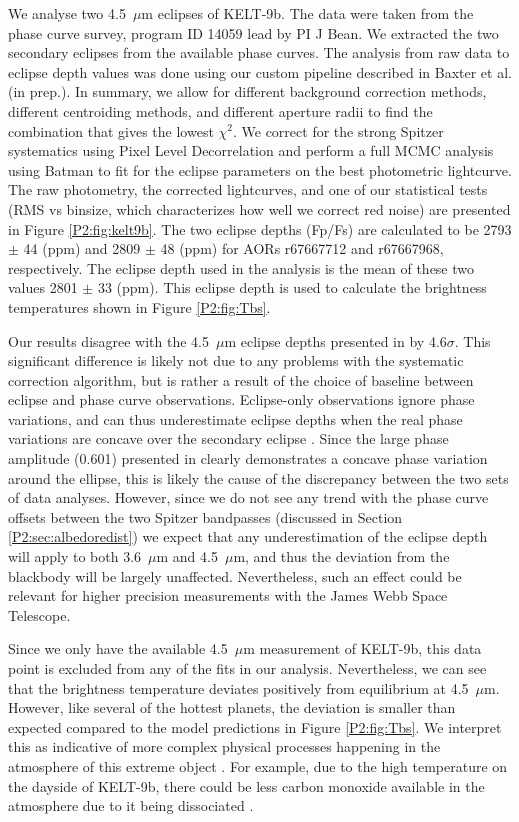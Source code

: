 \begin{subappendices}
We analyse two 4.5~$\mu$m eclipses of KELT-9b. The data were taken from the phase curve survey,   program ID 14059 lead by PI J Bean. We extracted the two secondary eclipses from the available phase curves. The analysis from raw data to eclipse depth values was done using our custom pipeline described in Baxter et al. (in prep.). In summary, we allow for different background correction methods, different centroiding methods, and different aperture radii to find the combination that gives the lowest $\chi^2$. We correct for the strong Spitzer systematics using Pixel Level Decorrelation \citep{Deming2015} and perform a full MCMC analysis using Batman \citep{Kreidberg2015} to fit for the eclipse parameters on the best photometric lightcurve. The raw photometry, the corrected lightcurves, and one of our statistical tests (RMS vs binsize, which characterizes how well we correct red noise) are  presented in Figure \ref{P2:fig:kelt9b}. The two eclipse depths (Fp/Fs) are calculated to be 2793 $\pm$ 44 (ppm) and 2809 $\pm$ 48 (ppm) for AORs r67667712 and r67667968, respectively. The eclipse depth used in the analysis is the mean of these two values 2801 $\pm$ 33 (ppm). This eclipse depth is used to calculate the brightness temperatures shown in Figure \ref{P2:fig:Tbs}.

Our results disagree with the 4.5~$\mu$m eclipse depths presented in \citet{Mansfield2020} by 4.6$\sigma$. This significant difference is likely not due to any problems with the systematic correction algorithm, but is rather a result of the choice of baseline between eclipse and phase curve observations. Eclipse-only observations ignore phase variations, and can thus underestimate eclipse depths when the real phase variations are concave over the secondary eclipse \citep[e.g.,][]{Bell2019}. Since the large phase amplitude (0.601) presented in \citet{Mansfield2020} clearly demonstrates a concave phase variation around the ellipse, this is likely the cause of the discrepancy between the two sets of data analyses. However, since we do not see any trend with the phase curve offsets between the two Spitzer bandpasses (discussed in Section \ref{P2:sec:albedoredist}) we expect that any underestimation of the eclipse depth will apply to both 3.6~$\mu$m and 4.5~$\mu$m, and thus the deviation from the blackbody will be largely unaffected. Nevertheless, such an effect could be relevant for higher precision measurements with the James Webb Space Telescope.

Since we only have the available 4.5~$\mu$m measurement of KELT-9b, this data point is excluded from any of the fits in our analysis. Nevertheless, we can see that the brightness temperature deviates positively from equilibrium at 4.5~$\mu$m. However, like several of the hottest planets, the deviation is smaller than expected compared to the model predictions in Figure \ref{P2:fig:Tbs}. We interpret this as indicative of more complex physical processes happening in the atmosphere of this extreme object \citep{Bell2018, Komacek2018b, Lothringer2018, Kitzmann2018, Mansfield2020}. For example, due to the high temperature on the dayside of KELT-9b, there could be less carbon monoxide available in the atmosphere due to it being dissociated \citep{Kitzmann2018}.



\end{subappendices}
